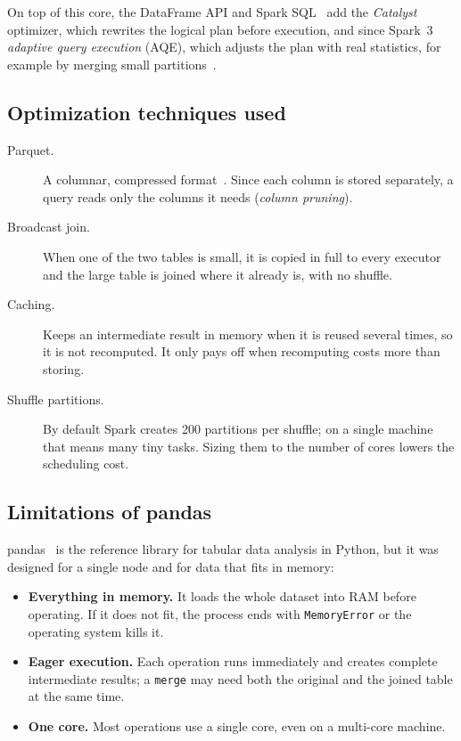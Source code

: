 \documentclass[11pt,a4paper]{article}
\begin{document}
On top of this core, the DataFrame API and Spark SQL~\cite{armbrust2015} add the
\emph{Catalyst} optimizer, which rewrites the logical plan before execution, and since
Spark~3 \emph{adaptive query execution} (AQE), which adjusts the plan with real statistics,
for example by merging small partitions~\cite{sparkdocs}.

\subsection{Optimization techniques used}

\begin{description}
  \item[Parquet.] A columnar, compressed format~\cite{parquet}. Since each column is stored
  separately, a query reads only the columns it needs (\emph{column pruning}).
  \item[Broadcast join.] When one of the two tables is small, it is copied in full to every
  executor and the large table is joined where it already is, with no shuffle.
  \item[Caching.] Keeps an intermediate result in memory when it is reused several times, so
  it is not recomputed. It only pays off when recomputing costs more than storing.
  \item[Shuffle partitions.] By default Spark creates 200 partitions per shuffle; on a single
  machine that means many tiny tasks. Sizing them to the number of cores lowers the
  scheduling cost.
\end{description}

\subsection{Limitations of pandas}

pandas~\cite{mckinney2010} is the reference library for tabular data analysis in Python,
but it was designed for a single node and for data that fits in memory:

\begin{itemize}
  \item \textbf{Everything in memory.} It loads the whole dataset into RAM before operating.
  If it does not fit, the process ends with \texttt{MemoryError} or the operating system
  kills it.
  \item \textbf{Eager execution.} Each operation runs immediately and creates complete
  intermediate results; a \texttt{merge} may need both the original and the joined table at
  the same time.
  \item \textbf{One core.} Most operations use a single core, even on a multi-core machine.
\end{itemize}
\end{document}
